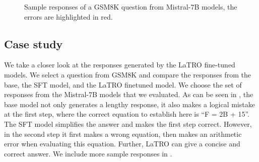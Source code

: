 \begin{figure}[ht]
    
    
    
    
    
    
    
        
        
    
    \caption{Sample responses of a GSM8K question from Mistral-7B models, the errors are highlighted in red.}
    \label{fig:samples_mistral}
\end{figure}



\subsection{Case study}
\label{sec:analysis}
 We take a closer look at the responses generated by the LaTRO fine-tuned models. 
 We select a question from GSM8K and compare the responses from the base, the SFT model, and the LaTRO finetuned model. 
 We choose the set of responses from the Mistral-7B models that we evaluated. As can be seen in , the base model not only generates a lengthy response, it also makes a logical mistake at the first step, where the correct equation to establish here is ``F = 2B + 15''. The SFT model simplifies the answer and makes the first step correct. However, in the second step it first makes a wrong equation, then makes an arithmetic error when evaluating this equation. Further, LaTRO can give a concise and correct answer. We include more sample responses in .
